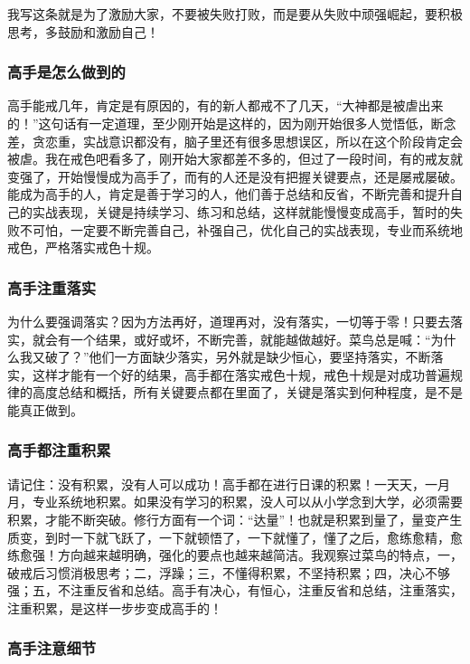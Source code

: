 我写这条就是为了激励大家，不要被失败打败，而是要从失败中顽强崛起，要积极思考，多鼓励和激励自己！

\subsubsection{高手是怎么做到的}

高手能戒几年，肯定是有原因的，有的新人都戒不了几天，“大神都是被虐出来的！”这句话有一定道理，至少刚开始是这样的，因为刚开始很多人觉悟低，断念差，贪恋重，实战意识都没有，脑子里还有很多思想误区，所以在这个阶段肯定会被虐。我在戒色吧看多了，刚开始大家都差不多的，但过了一段时间，有的戒友就变强了，开始慢慢成为高手了，而有的人还是没有把握关键要点，还是屡戒屡破。能成为高手的人，肯定是善于学习的人，他们善于总结和反省，不断完善和提升自己的实战表现，关键是持续学习、练习和总结，这样就能慢慢变成高手，暂时的失败不可怕，一定要不断完善自己，补强自己，优化自己的实战表现，专业而系统地戒色，严格落实戒色十规。

\subsubsection{高手注重落实}

为什么要强调落实？因为方法再好，道理再对，没有落实，一切等于零！只要去落实，就会有一个结果，或好或坏，不断完善，就能越做越好。菜鸟总是喊：“为什么我又破了？”他们一方面缺少落实，另外就是缺少恒心，要坚持落实，不断落实，这样才能有一个好的结果，高手都在落实戒色十规，戒色十规是对成功普遍规律的高度总结和概括，所有关键要点都在里面了，关键是落实到何种程度，是不是能真正做到。

\subsubsection{高手都注重积累}

请记住：没有积累，没有人可以成功！高手都在进行日课的积累！一天天，一月月，专业系统地积累。如果没有学习的积累，没人可以从小学念到大学，必须需要积累，才能不断突破。修行方面有一个词：“达量”！也就是积累到量了，量变产生质变，到时一下就飞跃了，一下就顿悟了，一下就懂了，懂了之后，愈练愈精，愈练愈强！方向越来越明确，强化的要点也越来越简洁。我观察过菜鸟的特点，一，破戒后习惯消极思考；二，浮躁；三，不懂得积累，不坚持积累；四，决心不够强；五，不注重反省和总结。高手有决心，有恒心，注重反省和总结，注重落实，注重积累，是这样一步步变成高手的！

\subsubsection{高手注意细节}


